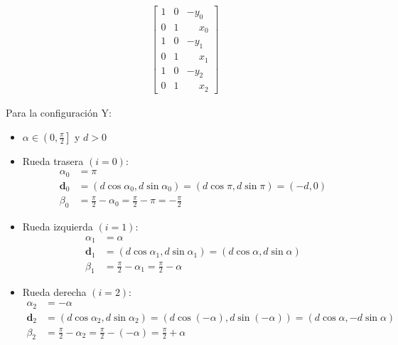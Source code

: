 \documentclass[11pt,a4paper]{article}
\newcommand{\vect}[1]{\bm{#1}}       %
\begin{document}
\begin{equation}
\begin{aligned}
\begin{bmatrix}
                                  1 & 0 & -y_0           \\
                                  0 & 1 & \phantom{-}x_0 \\
                                  1 & 0 & -y_1           \\
                                  0 & 1 & \phantom{-}x_1 \\
                                  1 & 0 & -y_2           \\
                                  0 & 1 & \phantom{-}x_2
                              \end{bmatrix}
    \end{aligned}
\end{equation}

Para la configuración Y:

\begin{itemize}
    \item \(\alpha \in \left(0, \frac{\pi}{2}\right]\) y \(d > 0\)
    \item Rueda trasera \((i = 0)\):
          \[
              \begin{aligned}
                  \alpha_0   & = \pi                                                             \\
                  \vect{d}_0 & = (d\cos\alpha_0, d\sin\alpha_0) = (d\cos\pi, d\sin\pi) = (-d, 0) \\
                  \beta_0    & = \frac{\pi}{2} - \alpha_0 = \frac{\pi}{2} - \pi = -\frac{\pi}{2}
              \end{aligned}
          \]
    \item Rueda izquierda \((i = 1)\):
          \[
              \begin{aligned}
                  \alpha_1   & = \alpha                                                      \\
                  \vect{d}_1 & = (d\cos\alpha_1, d\sin\alpha_1) = (d\cos\alpha, d\sin\alpha) \\
                  \beta_1    & = \frac{\pi}{2} - \alpha_1 = \frac{\pi}{2} - \alpha
              \end{aligned}
          \]
    \item Rueda derecha \((i = 2)\):
          \[
              \begin{aligned}
                  \alpha_2   & = -\alpha                                                                                         \\
                  \vect{d}_2 & = (d\cos\alpha_2, d\sin\alpha_2) = (d\cos(-\alpha), d\sin(-\alpha)) = (d\cos\alpha, -d\sin\alpha) \\
                  \beta_2    & = \frac{\pi}{2} - \alpha_2 = \frac{\pi}{2} - (-\alpha) = \frac{\pi}{2} + \alpha
              \end{aligned}
          \]
\end{itemize}
\end{document}
